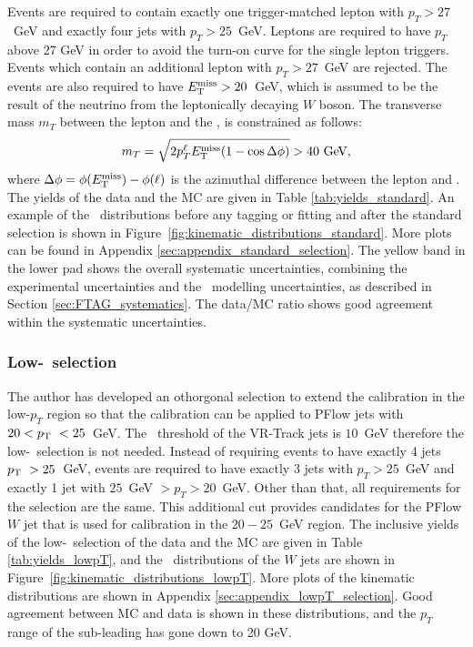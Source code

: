 \documentclass[letterpaper,12pt]{article}
\begin{document}
Events are required to contain exactly one trigger-matched 
lepton with $p_{T} > 27$~GeV and exactly four jets with 
$p_{T} > 25$~GeV. Leptons are required to have $p_{T}$ 
above 27 GeV in order to avoid the turn-on curve for the 
single lepton triggers. Events which contain an additional 
lepton with $p_T > 27$~GeV are rejected. 
The events are also required to have $E_{\mathrm T}^{\mathrm{miss}} > 20$~GeV, which is 
assumed to be the result of the neutrino from the leptonically 
decaying $W$ boson. The transverse
mass $m_T$ between the lepton and the \MET, is
constrained as follows:
\[ m_T = \sqrt{2 p_T^\ell E_{\mathrm T}^{\mathrm{miss}} (1-\cos\Delta\phi)} > 40~\text{Ge\kern -0.1em V},\]
where $\Delta\phi = \phi(E_{\mathrm T}^{\mathrm{miss}})-\phi(\ell)$ is the azimuthal difference between
the lepton and \MET.
The yields of the data and the MC are given in Table \ref{tab:yields_standard}.
An example of the \pt\ distributions
before any tagging or fitting and 
after the standard selection is shown in Figure~\ref{fig:kinematic_distributions_standard}. 
More plots can be found in Appendix \ref{sec:appendix_standard_selection}.
The yellow band in the lower pad shows the overall systematic uncertainties, combining the 
experimental uncertainties and the \ttbar\ modelling uncertainties, as described in 
Section \ref{sec:FTAG_systematics}. The data/MC ratio shows good agreement 
within the systematic uncertainties. 

\subsubsection{Low-\pt\ selection}
\label{sec:lowpT_selection}
The author has developed an othorgonal selection to 
extend the calibration in the low-$p_{T}$ region so that the calibration 
can be applied to PFlow jets with $20< p_{\mathrm T}\ < 25$~GeV.
The \pt\ threshold of the VR-Track jets is $10$~GeV 
therefore the low-\pt\ selection is not needed. 
Instead of requiring events to 
have exactly 4 jets $p_{\mathrm T}\ > 25$~GeV, events are required to have exactly 3 jets with $p_{T} > 25$~GeV 
and exactly 1 jet with $25$~GeV $> p_{T} > 20$~GeV. Other than that, 
all requirements for the selection are the same. 
This additional cut provides candidates for the PFlow $W$ jet that is used 
for calibration in the $20-25$~GeV region. 
The inclusive yields of the low-\pt\ selection 
of the data and the MC are given in Table \ref{tab:yields_lowpT}, and
the \pt\ distributions of the $W$ jets are shown in Figure~\ref{fig:kinematic_distributions_lowpT}.
More plots of the kinematic distributions
are shown in Appendix \ref{sec:appendix_lowpT_selection}. 
Good agreement between MC and data 
is shown in these distributions, and the $p_{T}$ range of the sub-leading has gone down to 20 GeV. 
\end{document}
